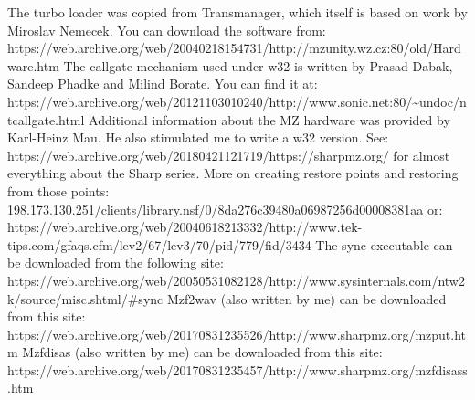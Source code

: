 \begin{thebibliography}{XX}
 The turbo loader was copied from Transmanager, which itself is 
             based on work by Miroslav Nemecek. You can download the software 
             from: https://web.archive.org/web/20040218154731/http://mzunity.wz.cz:80/old/Hardware.htm 
 The callgate mechanism used under w32 is written by Prasad Dabak, 
             Sandeep Phadke and Milind Borate. You can find it at: 
             https://web.archive.org/web/20121103010240/http://www.sonic.net:80/\~{}undoc/ntcallgate.html 
 Additional information about the MZ hardware was provided by 
             Karl-Heinz Mau.  He also stimulated me to write a w32 version. 
             See: https://web.archive.org/web/20180421121719/https://sharpmz.org/ for almost everything 
             about the Sharp series.
 More on creating restore points and restoring from those points:
         198.173.130.251/clients/library.nsf/0/8da276c39480a06987256d00008381aa
         or: https://web.archive.org/web/20040618213332/http://www.tek-tips.com/gfaqs.cfm/lev2/67/lev3/70/pid/779/fid/3434
 The sync executable can be downloaded from the following site:
              https://web.archive.org/web/20050531082128/http://www.sysinternals.com/ntw2k/source/misc.shtml/#sync
 Mzf2wav (also written by me) can be downloaded from this site:
              https://web.archive.org/web/20170831235526/http://www.sharpmz.org/mzput.htm
 Mzfdisas (also written by me) can be downloaded from this site:
              https://web.archive.org/web/20170831235457/http://www.sharpmz.org/mzfdisass.htm
\end{thebibliography}



